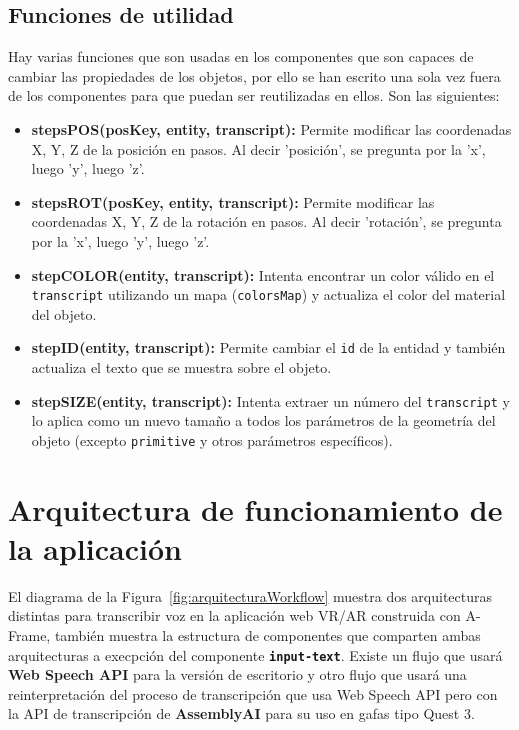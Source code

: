 \documentclass[a4paper, 12pt]{book}
\begin{document}
\subsection{Funciones de utilidad}
Hay varias funciones que son usadas en los componentes que son capaces de cambiar las propiedades de los objetos, por ello se han escrito una sola vez fuera de los componentes para que puedan ser reutilizadas en ellos.
Son las siguientes:
\begin{itemize}
  \setlength\itemsep{0.3em}
\setlength\parskip{0pt}  
  \item \textbf{stepsPOS(posKey, entity, transcript):} Permite modificar las coordenadas X, Y, Z de la posición en pasos. Al decir 'posición', se pregunta por la 'x', luego 'y', luego 'z'.
  \item \textbf{stepsROT(posKey, entity, transcript):} Permite modificar las coordenadas X, Y, Z de la rotación en pasos. Al decir 'rotación', se pregunta por la 'x', luego 'y', luego 'z'.
  \item \textbf{stepCOLOR(entity, transcript):} Intenta encontrar un color válido en el \texttt{transcript} utilizando un mapa (\texttt{colorsMap}) y actualiza el color del material del objeto.
  \item \textbf{stepID(entity, transcript):} Permite cambiar el \texttt{id} de la entidad y también actualiza el texto que se muestra sobre el objeto.
  \item \textbf{stepSIZE(entity, transcript):} Intenta extraer un número del \texttt{transcript} y lo aplica como un nuevo tamaño a todos los parámetros de la geometría del objeto (excepto \texttt{primitive} y otros parámetros específicos).
\end{itemize}

\section{Arquitectura de funcionamiento de la aplicación}
\label{sec:funcionamiento}

El diagrama de la Figura~\ref{fig:arquitecturaWorkflow} muestra dos arquitecturas distintas para transcribir voz en la aplicación web VR/AR construida con A-Frame, también muestra la estructura de componentes que comparten ambas arquitecturas a execpción del componente \texttt{\textbf{input-text}}.
Existe un flujo que usará \textbf{Web Speech API} para la versión de escritorio y otro flujo que usará una reinterpretación del proceso de transcripción que usa Web Speech API pero con la API de transcripción de \textbf{AssemblyAI} para su uso en gafas tipo Quest 3.
\end{document}
